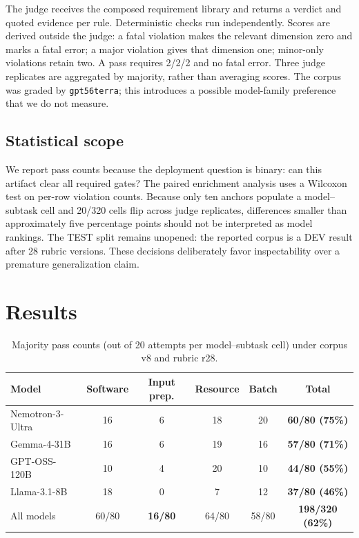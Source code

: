 \documentclass[conference]{IEEEtran}
\begin{document}
The judge receives the composed requirement library and returns a verdict and quoted evidence per rule. Deterministic checks run independently. Scores are derived outside the judge: a fatal violation makes the relevant dimension zero and marks a fatal error; a major violation gives that dimension one; minor-only violations retain two. A pass requires 2/2/2 and no fatal error. Three judge replicates are aggregated by majority, rather than averaging scores. The corpus was graded by \texttt{gpt56terra}; this introduces a possible model-family preference that we do not measure.

\subsection{Statistical scope}
We report pass counts because the deployment question is binary: can this artifact clear all required gates? The paired enrichment analysis uses a Wilcoxon test on per-row violation counts. Because only ten anchors populate a model--subtask cell and 20/320 cells flip across judge replicates, differences smaller than approximately five percentage points should not be interpreted as model rankings. The TEST split remains unopened: the reported corpus is a DEV result after 28 rubric versions. These decisions deliberately favor inspectability over a premature generalization claim.

\section{Results}
\label{sec:results}
\begin{table}[t]
\caption{Majority pass counts (out of 20 attempts per model--subtask cell) under corpus v8 and rubric r28.}
\label{tab:main}
\centering
\begin{tabular}{lccccc}
\toprule
Model & Software & Input prep. & Resource & Batch & Total \\
\midrule
Nemotron-3-Ultra & 16 & 6 & 18 & 20 & \textbf{60/80 (75\%)} \\
Gemma-4-31B & 16 & 6 & 19 & 16 & \textbf{57/80 (71\%)} \\
GPT-OSS-120B & 10 & 4 & 20 & 10 & \textbf{44/80 (55\%)} \\
Llama-3.1-8B & 18 & 0 & 7 & 12 & \textbf{37/80 (46\%)} \\
\midrule
All models & 60/80 & \textbf{16/80} & 64/80 & 58/80 & \textbf{198/320 (62\%)} \\
\bottomrule
\end{tabular}
\end{table}
\end{document}
